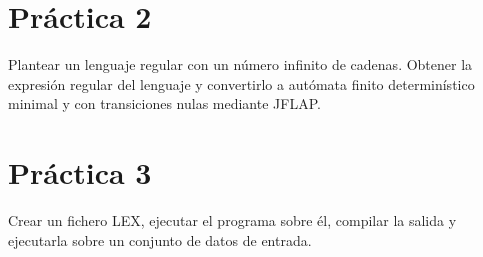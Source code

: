 \documentclass[12pt,spanish]{article}
\begin{document}
\section{Práctica 2}
Plantear un lenguaje regular con un número infinito de cadenas. Obtener la expresión regular del lenguaje y convertirlo a autómata finito determinístico minimal y con transiciones nulas mediante JFLAP.


\section{Práctica 3}
Crear un fichero LEX, ejecutar el programa sobre él, compilar la salida y ejecutarla sobre un conjunto de datos de entrada.
\end{document}
